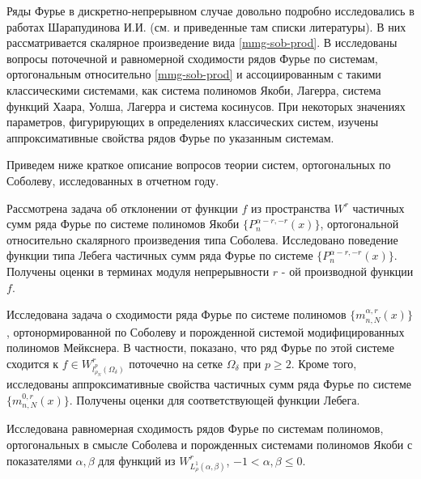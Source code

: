 Ряды Фурье в дискретно-непрерывном случае довольно подробно исследовались в работах Шарапудинова И.И. (см. \cite{mmg-SharapudinovUMN,mmg-SharapudinovIzvRan2019} и приведенные там списки литературы). В них рассматривается скалярное произведение вида \eqref{mmg-sob-prod}.
В \cite{mmg-SharapudinovUMN,mmg-SharapudinovIzvRan2019,mmg-MMG2019,mmg-Gadzhimirzaev2019} исследованы вопросы поточечной и равномерной сходимости рядов Фурье по системам, ортогональным относительно \eqref{mmg-sob-prod} и ассоциированным с такими классическими системами, как система полиномов Якоби, Лагерра, система функций Хаара, Уолша, Лагерра и система косинусов. При некоторых значениях параметров, фигурирующих в определениях классических систем, изучены аппроксимативные свойства рядов Фурье по указанным системам.

Приведем ниже краткое описание вопросов теории систем, ортогональных по Соболеву, исследованных в отчетном году.

Рассмотрена задача об отклонении от функции $f$ из пространства $W^r$ частичных сумм ряда Фурье по системе полиномов Якоби $\{P_n^{\alpha-r,-r}(x)\}$, ортогональной относительно скалярного произведения типа Соболева. Исследовано поведение функции типа Лебега частичных сумм ряда Фурье по системе $\{P_n^{\alpha-r,-r}(x)\}$. Получены оценки в терминах модуля непрерывности $r$ - ой производной функции $f$.

Исследована задача о сходимости ряда Фурье по системе полиномов $\{m_{n,N}^{\alpha,r}(x)\}$, ортонормированной по Соболеву и порожденной системой модифицированных полиномов Мейкснера. В частности, показано, что ряд Фурье по этой системе сходится к $f\in W^r_{l^p_{\rho_N}(\Omega_\delta)}$ поточечно на сетке $\Omega_\delta$ при $p\ge2$. Кроме того, исследованы аппроксимативные свойства частичных сумм ряда Фурье по системе $\{m_{n,N}^{0,r}(x)\}$. Получены оценки для соответствующей функции Лебега.


Исследована равномерная сходимость рядов Фурье по системам полиномов, ортогональных в смысле Соболева и порожденных системами полиномов Якоби с показателями $\alpha, \beta$ для функций из $W^r_{L^1_\rho(\alpha,\beta)}$, $-1 <\alpha, \beta  \le 0$.


